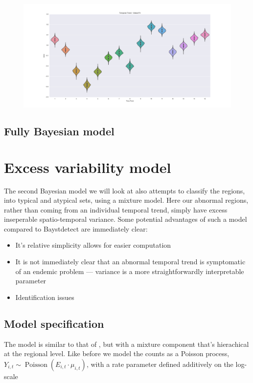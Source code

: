 \documentclass{article}
\begin{document}
\begin{figure}
\centering
\includegraphics[width=\textwidth]{global_temporal}
\end{figure}

\subsection{Fully Bayesian model}


\section{Excess variability model}

The second Bayesian model we will look at also attempts to classify the regions, into typical and atypical sets, using a mixture model. Here our abnormal regions, rather than coming from an individual temporal trend, simply have excess inseperable spatio-temporal variance. Some potential advantages of such a model compared to Baystdetect are immediately clear:
\begin{itemize}
\item It's relative simplicity allows for easier computation
\item It is not immediately clear that an abnormal temporal trend is symptomatic of an endemic problem --- variance is a more straightforwardly interpretable parameter
\item Identification issues
\end{itemize}

\subsection{Model specification}

The model is similar to that of \cite{stability}, but with a mixture component that's hierachical at the regional level. Like before we model the counts as a Poisson process, $Y_{i,t} \sim \operatorname{Poisson}(E_{i,t} \cdot \mu_{i,t})$, with a rate parameter defined additively on the log-scale
\end{document}
